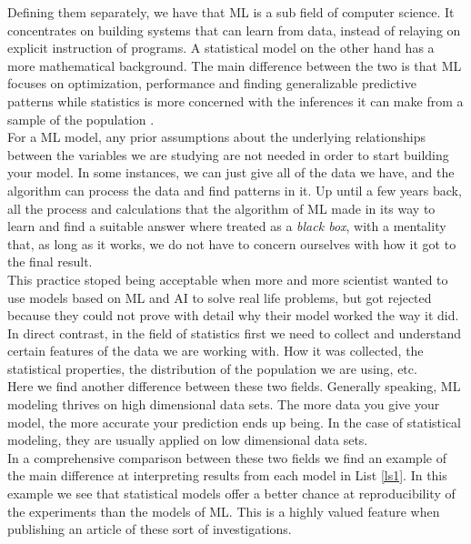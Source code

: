 \documentclass[review]{elsarticle}
\begin{document}
Defining them separately, we have that ML is a sub field of computer science. It concentrates on building systems that can learn from data, instead of relaying on explicit instruction of programs. A statistical model on the other hand has a more mathematical background. The main difference between the two is that ML focuses on optimization, performance and finding generalizable predictive patterns while statistics is more concerned with the inferences it can make from a sample of the population \cite{wstat}.\\

For a ML model, any prior assumptions about the underlying relationships between the variables we are studying are not needed in order to start building your model. In some instances, we can just give all of the data we have, and the algorithm can process the data and find patterns in it. Up until a few years back, all the process and calculations that the algorithm of ML made in its way to learn and find a suitable answer where treated as a \textit{black box}, with a mentality that, as long as it works, we do not have to concern ourselves with how it got to the final result.\\

This practice stoped being acceptable when more and more scientist wanted to use models based on ML and AI to solve real life problems, but got rejected because they could not prove with detail why their model worked the way it did. In direct contrast, in the field of statistics first we need to collect and understand certain features of the data we are working with. How it was collected, the statistical properties, the distribution of the population we are using, etc. \\

Here we find another difference between these two fields. Generally speaking, ML modeling thrives on high dimensional data sets. The more data you give your model, the more accurate your prediction ends up being. In the case of statistical modeling, they are usually applied on low dimensional data sets.\\

In a comprehensive comparison between these two fields \cite{kdnuggets1} we find an example of the main difference at interpreting results from each model in List \ref{ls1}. In this example we see that statistical models offer a better chance at reproducibility of the experiments than the models of ML. This is a highly valued feature when publishing an article of these sort of investigations.\\
\end{document}
